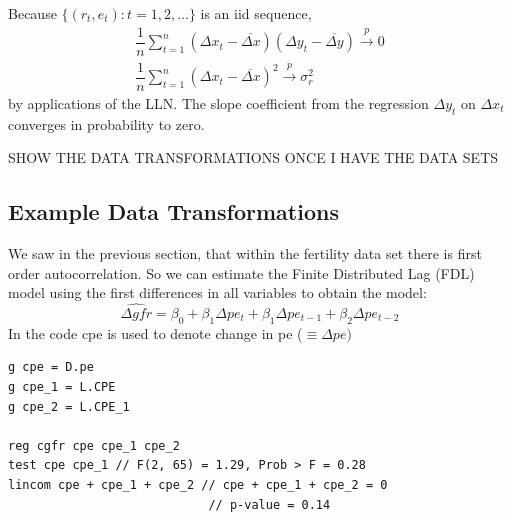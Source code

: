 \documentclass[11pt]{article}
\begin{document}
Because $\{(r_t, e_t): t=1,2,\ldots\}$ is an iid sequence,
\begin{gather*}
    \dfrac{1}{n}\sum_{t=1}^n (\Delta x_t - \overline{\Delta x})(\Delta y_t - \overline{\Delta y}) \xrightarrow{p}0 \\
    \dfrac{1}{n}\sum_{t=1}^n (\Delta x_t - \overline{\Delta x})^2 \xrightarrow{p} \sigma_r^2
\end{gather*}
by applications of the LLN. The slope coefficient from the regression $\Delta y_t$ on $\Delta x_t$ converges in probability to zero.

\begin{shaded}
    SHOW THE DATA TRANSFORMATIONS ONCE I HAVE THE DATA SETS
\end{shaded}

\subsection{Example Data Transformations}
We saw in the previous section, that within the fertility data set there is first order autocorrelation. So we can estimate the Finite Distributed Lag (FDL) model using the first differences in all variables to obtain the model:
\[\widehat{\Delta gfr} = \beta_0 + \beta_1 \Delta pe_t + \beta_1 \Delta pe_{t-1} + \beta_2 \Delta pe_{t-2}\]
In the code cpe is used to denote change in pe ($\equiv \Delta pe)$
\begin{lstlisting}[caption = Differencing and testing the Statistical Significance]
g cpe = D.pe
g cpe_1 = L.CPE
g cpe_2 = L.CPE_1

reg cgfr cpe cpe_1 cpe_2
test cpe cpe_1 // F(2, 65) = 1.29, Prob > F = 0.28
lincom cpe + cpe_1 + cpe_2 // cpe + cpe_1 + cpe_2 = 0
                            // p-value = 0.14
\end{lstlisting}
\end{document}

